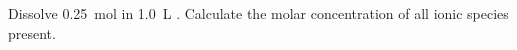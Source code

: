 \documentclass[12pt]{article}
\begin{document}
\noindent
Dissolve \SI{0.25}{\mol}  in \SI{1.0}{\liter} \water. Calculate the
molar concentration of all ionic species present.
\end{document}
